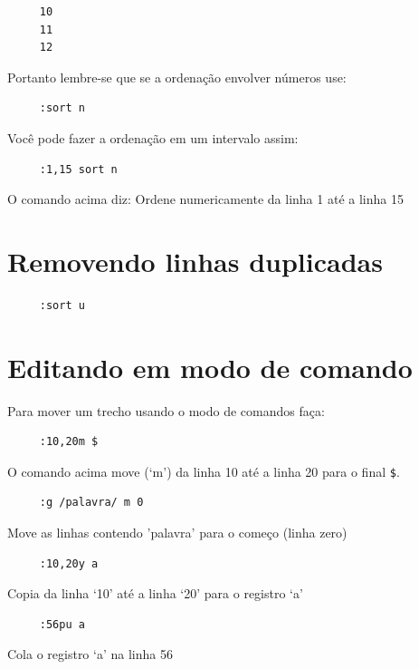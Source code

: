 \documentclass[10pt,a4paper,openany]{book}
\begin{document}
\begin{verbatim}
     10
     11
     12
\end{verbatim}

Portanto lembre-se que se a ordenação envolver números use:

\begin{verbatim}
     :sort n
\end{verbatim}

Você pode fazer a ordenação em um intervalo assim:

\begin{verbatim}
     :1,15 sort n
\end{verbatim}

O comando acima diz: Ordene numericamente da linha 1 até a linha 15

\section{Removendo linhas duplicadas}

\begin{verbatim}
     :sort u
\end{verbatim}


\section{Editando em modo de comando}\label{sec:Editando em modo de comando}

Para mover um trecho usando o modo de comandos faça:

\begin{verbatim}
     :10,20m $
\end{verbatim}

O comando acima move (`m') da linha 10 até a linha 20 para o final \verb|$|.

\begin{verbatim}
     :g /palavra/ m 0
\end{verbatim}

Move as linhas contendo 'palavra' para o começo (linha zero)


\begin{verbatim}
     :10,20y a
\end{verbatim}

Copia da linha `10' até a linha `20' para o registro `a'

\begin{verbatim}
     :56pu a
\end{verbatim}

Cola o registro `a' na linha 56
\end{document}

